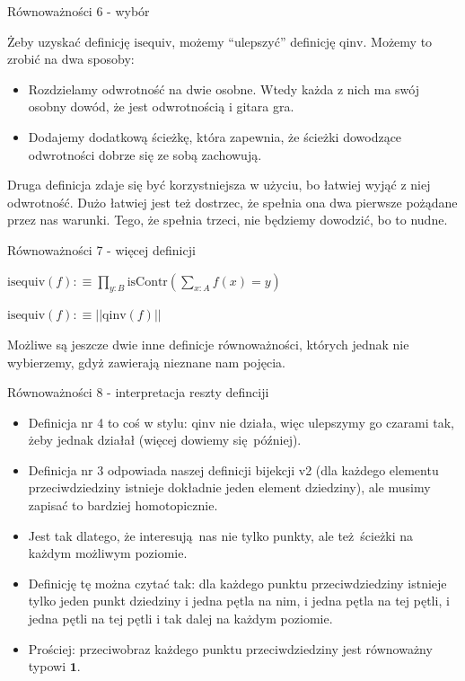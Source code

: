\documentclass{beamer}
\newcommand{\defn}{:\equiv}
\newcommand{\qinv}{\text{qinv}}
\newcommand{\isequiv}{\text{isequiv}}
\begin{document}
\begin{frame}{Równoważności 6 - wybór}

Żeby uzyskać definicję $\isequiv$, możemy ``ulepszyć'' definicję $\qinv$. Możemy to zrobić na dwa sposoby:

\begin{itemize}
	\item Rozdzielamy odwrotność na dwie osobne. Wtedy każda z nich ma swój osobny dowód, że jest odwrotnością i gitara gra.
	\item Dodajemy dodatkową ścieżkę, która zapewnia, że ścieżki dowodzące odwrotności dobrze się ze sobą zachowują.
\end{itemize}

Druga definicja zdaje się być korzystniejsza w użyciu, bo łatwiej wyjąć z niej odwrotność. Dużo łatwiej jest też dostrzec, że spełnia ona dwa pierwsze pożądane przez nas warunki. Tego, że spełnia trzeci, nie będziemy dowodzić, bo to nudne.

\end{frame}

\begin{frame}{Równoważności 7 - więcej definicji}

\begin{definition}[Równoważność 3]
$
\displaystyle
	\isequiv(f) \defn
		\prod_{y : B} \text{isContr}\left(\sum_{x : A} f(x) = y\right)
$
\end{definition}


\begin{definition}[Równoważność 4]
$
\displaystyle
	\isequiv(f) \defn ||\qinv(f)||
$
\end{definition}

Możliwe są jeszcze dwie inne definicje równoważności, których jednak nie wybierzemy, gdyż zawierają nieznane nam pojęcia.

\end{frame}

\begin{frame}{Równoważności 8 - interpretacja reszty definciji}
\begin{itemize}
	\item Definicja nr 4 to coś w stylu: $\qinv$ nie działa, więc ulepszymy go czarami tak, żeby jednak działał (więcej dowiemy się później).
	\item Definicja nr 3 odpowiada naszej definicji bijekcji v2 (dla każdego elementu przeciwdziedziny istnieje dokładnie jeden element dziedziny), ale musimy zapisać to bardziej homotopicznie.
	\item Jest tak dlatego, że interesują nas nie tylko punkty, ale też ścieżki na każdym możliwym poziomie.
	\item Definicję tę można czytać tak: dla każdego punktu przeciwdziedziny istnieje tylko jeden punkt dziedziny i jedna pętla na nim, i jedna pętla na tej pętli, i jedna pętli na tej pętli i tak dalej na każdym poziomie.
	\item Prościej: przeciwobraz każdego punktu przeciwdziedziny jest równoważny typowi $\mathbf{1}$.
\end{itemize}
\end{frame}
\end{document}

